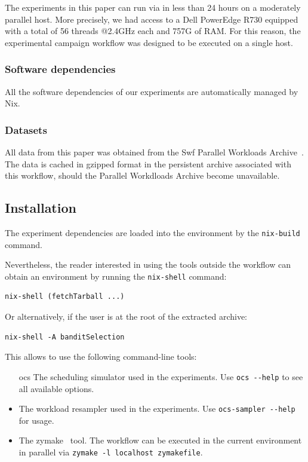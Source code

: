\documentclass[sigconf,review]{acmart}
\begin{document}
 The experiments in this paper can run via in less than 24 hours on a
 moderately parallel host. More precisely, we had access to a Dell PowerEdge
 R730 equipped with a total of 56 threads @2.4GHz each and 757G of RAM. For
 this reason, the experimental campaign workflow was designed to be executed on
 a single host.

\subsubsection{Software dependencies}

All the software dependencies of our experiments are automatically managed by Nix.

\subsubsection{Datasets}

All data from this paper was obtained from the Swf Parallel Workloads
Archive~\cite{Feitelson20142967}. The data is cached in gzipped format in the
persistent archive associated with this workflow, should the Parallel
Workdloads Archive become unavailable.

\subsection{Installation}

The experiment dependencies are loaded into the environment by the
\lstinline[basicstyle=\ttfamily]|nix-build| command.

Nevertheless, the reader interested in using the tools outside the workflow can
obtain an environment by running the
\lstinline[basicstyle=\ttfamily]|nix-shell| command:

\begin{lstlisting}
nix-shell (fetchTarball ...)
\end{lstlisting}

Or alternatively, if the user is at the root of the extracted archive:

\begin{lstlisting}
nix-shell -A banditSelection
\end{lstlisting}

This allows to use the following command-line tools:

\begin{itemize}

  \item[ocs] The scheduling simulator used in the experiments. Use
    \lstinline[basicstyle=\ttfamily]|ocs --help| to see all available options.

  \item[ocs-sampler] The workload resampler used in the experiments. Use
    \lstinline[basicstyle=\ttfamily]|ocs-sampler --help| for usage.

  \item[zymake] The zymake~\cite{zymake} tool.
    The workflow can be executed in the current environment in parallel
    via \lstinline[basicstyle=\ttfamily]|zymake -l localhost zymakefile|.

\end{itemize}
\end{document}
